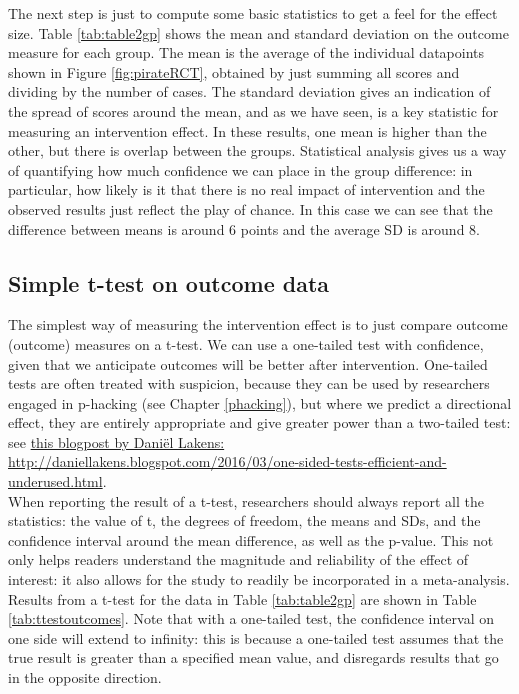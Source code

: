 \documentclass{krantz}
\begin{document}
The next step is just to compute some basic statistics to get a feel for the effect size. Table \ref{tab:table2gp} shows the mean and standard deviation on the outcome measure for each group. The mean is the average of the individual datapoints shown in Figure \ref{fig:pirateRCT}, obtained by just summing all scores and dividing by the number of cases. The standard deviation gives an indication of the spread of scores around the mean, and as we have seen, is a key statistic for measuring an intervention effect. In these results, one mean is higher than the other, but there is overlap between the groups. Statistical analysis gives us a way of quantifying how much confidence we can place in the group difference: in particular, how likely is it that there is no real impact of intervention and the observed results just reflect the play of chance. In this case we can see that the difference between means is around 6 points and the average SD is around 8.

\hypertarget{simple-t-test-on-outcome-data}{%
\subsection{Simple t-test on outcome data}\label{simple-t-test-on-outcome-data}}

The simplest way of measuring the intervention effect is to just compare outcome (outcome) measures on a t-test. We can use a one-tailed test with confidence, given that we anticipate outcomes will be better after intervention. One-tailed tests are often treated with suspicion, because they can be used by researchers engaged in p-hacking (see Chapter \ref{phacking}), but where we predict a directional effect, they are entirely appropriate and give greater power than a two-tailed test: see \href{http://daniellakens.blogspot.com/2016/03/one-sided-tests-efficient-and-underused.html}{this blogpost by Daniël Lakens: http://daniellakens.blogspot.com/2016/03/one-sided-tests-efficient-and-underused.html}.\\
When reporting the result of a t-test, researchers should always report all the statistics: the value of t, the degrees of freedom, the means and SDs, and the confidence interval around the mean difference, as well as the p-value. This not only helps readers understand the magnitude and reliability of the effect of interest: it also allows for the study to readily be incorporated in a meta-analysis. Results from a t-test for the data in Table \ref{tab:table2gp} are shown in Table \ref{tab:ttestoutcomes}. Note that with a one-tailed test, the confidence interval on one side will extend to infinity: this is because a one-tailed test assumes that the true result is greater than a specified mean value, and disregards results that go in the opposite direction. 
\end{document}
